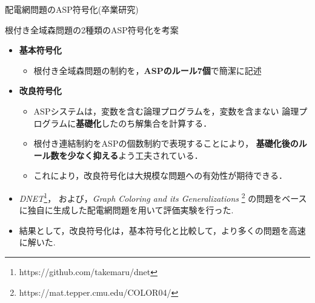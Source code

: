 \begin{frame}{配電網問題のASP符号化(卒業研究)}
   \begin{block}{根付き全域森問題の2種類のASP符号化を考案}
     \begin{itemize}
     \item \alert{\bf 基本符号化}
       \begin{itemize}
       \item 根付き全域森問題の制約を，\textbf{ASPのルール7個}で簡潔に記述
       \end{itemize}
     \item \alert{\bf 改良符号化}
       \begin{itemize}
       \item ASPシステムは，変数を含む論理プログラムを，変数を含まない
         論理プログラムに\textbf{基礎化}したのち解集合を計算する．
       \item 根付き連結制約をASPの個数制約で表現することにより，
         \textbf{基礎化後のルール数を少なく抑える}よう工夫されている．
       \item これにより，改良符号化は大規模な問題への有効性が期待できる．
       \end{itemize}
     \end{itemize}
   \end{block}
 \begin{itemize}
  \renewcommand{\thefootnote}{\fnsymbol{footnote}}
  \setcounter{footnote}{1}
  \item \textit{DNET}\footnote{https://github.com/takemaru/dnet}，
        および，\textit{Graph Coloring and its Generalizations}
        \footnote{https://mat.tepper.cmu.edu/COLOR04/}%
        の問題をベースに独自に生成した配電網問題を用いて評価実験を行った.
  \item 結果として，改良符号化は，基本符号化と比較して，より多くの問題を高速に解いた.
 \end{itemize}
\end{frame}

